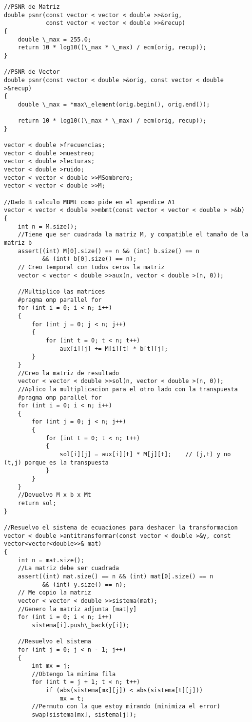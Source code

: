 \begin{lstlisting}
//PSNR de Matriz
double psnr(const vector < vector < double >>&orig,
            const vector < vector < double >>&recup)
{
    double \_max = 255.0;
    return 10 * log10((\_max * \_max) / ecm(orig, recup));
}

//PSNR de Vector
double psnr(const vector < double >&orig, const vector < double >&recup)
{
    double \_max = *max\_element(orig.begin(), orig.end());

    return 10 * log10((\_max * \_max) / ecm(orig, recup));
}

vector < double >frecuencias;
vector < double >muestreo;
vector < double >lecturas;
vector < double >ruido;
vector < vector < double >>MSombrero;
vector < vector < double >>M;

//Dado B calculo MBMt como pide en el apendice A1
vector < vector < double >>mbmt(const vector < vector < double > >&b)
{
    int n = M.size();
    //Tiene que ser cuadrada la matriz M, y compatible el tamaño de la matriz b
    assert((int) M[0].size() == n && (int) b.size() == n
           && (int) b[0].size() == n);
    // Creo temporal con todos ceros la matriz
    vector < vector < double >>aux(n, vector < double >(n, 0));

    //Multiplico las matrices
    #pragma omp parallel for
    for (int i = 0; i < n; i++)
    {
        for (int j = 0; j < n; j++)
        {
            for (int t = 0; t < n; t++)
                aux[i][j] += M[i][t] * b[t][j];
        }
    }
    //Creo la matriz de resultado
    vector < vector < double >>sol(n, vector < double >(n, 0));
    //Aplico la multiplicacion para el otro lado con la transpuesta
    #pragma omp parallel for
    for (int i = 0; i < n; i++)
    {
        for (int j = 0; j < n; j++)
        {
            for (int t = 0; t < n; t++)
            {
                sol[i][j] = aux[i][t] * M[j][t];	// (j,t) y no (t,j) porque es la transpuesta
            }
        }
    }
    //Devuelvo M x b x Mt
    return sol;
}

//Resuelvo el sistema de ecuaciones para deshacer la transformacion
vector < double >antitransformar(const vector < double >&y, const vector<vector<double>>& mat)
{
    int n = mat.size();
    //La matriz debe ser cuadrada
    assert((int) mat.size() == n && (int) mat[0].size() == n
           && (int) y.size() == n);
    // Me copio la matriz
    vector < vector < double >>sistema(mat);
    //Genero la matriz adjunta [mat|y]
    for (int i = 0; i < n; i++)
        sistema[i].push\_back(y[i]);

    //Resuelvo el sistema
    for (int j = 0; j < n - 1; j++)
    {
        int mx = j;
        //Obtengo la minima fila
        for (int t = j + 1; t < n; t++)
            if (abs(sistema[mx][j]) < abs(sistema[t][j]))
                mx = t;
        //Permuto con la que estoy mirando (minimiza el error)
        swap(sistema[mx], sistema[j]);


\end{lstlisting}
